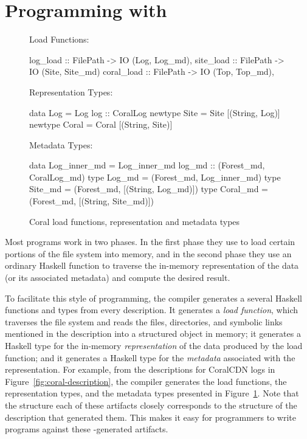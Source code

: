 \section{Programming with \forest{}}
\label{sec:exp}

\begin{figure}
Load Functions:
\begin{code}
log_load :: FilePath -> IO (Log, Log_md),
site_load :: FilePath -> IO (Site, Site_md)
coral_load :: FilePath -> IO (Top, Top_md),
\end{code}
%
Representation Types:
\begin{code}
data Log = Log { log :: CoralLog }
newtype Site = Site [(String, Log)]
newtype Coral = Coral [(String, Site)]
\end{code}
%
Metadata Types:
\begin{code}
data Log_inner_md = 
  Log_inner_md { log_md :: (Forest_md, CoralLog_md) }
type Log_md = (Forest_md, Log_inner_md)
type Site_md = (Forest_md, [(String, Log_md)])
type Coral_md = (Forest_md, [(String, Site_md)])
\end{code}
\caption{Coral load functions, representation and metadata types}
\label{fig:coral-aux}
\end{figure}

Most \forest{} programs work in two phases. In the first phase they
use \forest{} to load certain portions of the file system into memory,
and in the second phase they use an ordinary Haskell function to
traverse the in-memory representation of the data (or its associated
metadata) and compute the desired result.


To facilitate this style of programming, the \forest{} compiler
generates a several Haskell functions and types from every \forest{}
description.  It generates a \emph{load function}, which traverses the
file system and reads the files, directories, and symbolic links
mentioned in the description into a structured object in memory; it
generates a Haskell type for the in-memory \emph{representation} of
the data produced by the load function; and it generates a Haskell
type for the \emph{metadata} associated with the representation. For
example, from the descriptions for CoralCDN logs in
Figure~\ref{fig:coral-description}, the compiler generates the load
functions, the representation types, and the metadata types presented in
Figure~\ref{fig:coral-aux}. Note that the structure each of these
artifacts closely corresponds to the structure of the \forest{}
description that generated them. This makes it easy for programmers to
write programs against these \forest{}-generated artifacts.

